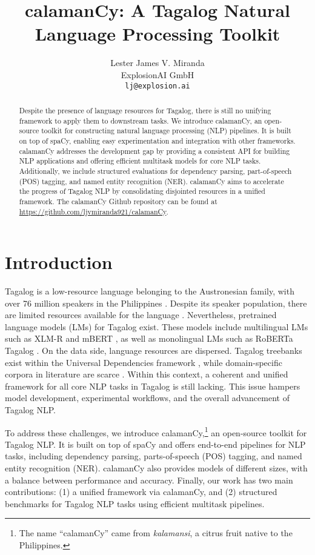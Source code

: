 \documentclass[11pt]{article}
\title{calamanCy: A Tagalog Natural Language Processing Toolkit}
\author{Lester James V. Miranda \\
  ExplosionAI GmbH \\
  \texttt{lj@explosion.ai}}
\begin{document}
\maketitle
\begin{abstract}
  Despite the presence of language resources for Tagalog, there is still no unifying framework to apply them to downstream tasks.
  We introduce calamanCy, an open-source toolkit for constructing natural language processing (NLP) pipelines.
  It is built on top of spaCy, enabling easy experimentation and integration with other frameworks.  
  calamanCy addresses the development gap by providing a consistent API for building NLP applications and offering efficient multitask models for core NLP tasks.
  Additionally, we include structured evaluations for dependency parsing, part-of-speech (POS) tagging, and named entity recognition (NER).
  calamanCy aims to accelerate the progress of Tagalog NLP by consolidating disjointed resources in a unified framework.
  The calamanCy Github repository can be found at \url{https://github.com/ljvmiranda921/calamanCy}.
\end{abstract}

\section{Introduction}

Tagalog is a low-resource language belonging to the Austronesian family, with over 76 million speakers in the Philippines \citep{Lewis2009EthnologueL}.
Despite its speaker population, there are limited resources available for the language \citep{Cruz2021ImprovingLL}. 
Nevertheless, pretrained language models (LMs) for Tagalog exist. 
These models include multilingual LMs such as XLM-R and mBERT \citep{Conneau2019UnsupervisedCR,Devlin2019BERTPO}, 
as well as monolingual LMs such as RoBERTa Tagalog \citep{Cruz2021ImprovingLL}. 
On the data side, language resources are dispersed.
Tagalog treebanks exist within the Universal Dependencies framework \citep{Dehouck2019PhylogenicMD,Kondratyuk201975L1,Aquino2020ParsingIT}, 
while domain-specific corpora in literature are scarce \citep{Enriquez2023DeterminingLF,Livelo2018IntelligentDI}. 
Within this context, a coherent and unified framework for all core NLP tasks in Tagalog is still lacking.
This issue hampers model development, experimental workflows, and the overall advancement of Tagalog NLP.

To address these challenges, we introduce calamanCy,\footnote[1]{
  The name ``calamanCy'' came from \textit{kalamansi}, a citrus fruit native to the Philippines.}
an open-source toolkit for Tagalog NLP. 
It is built on top of spaCy \citep{Honnibal2020Spacy} and offers end-to-end pipelines for NLP tasks, including dependency parsing, parts-of-speech (POS) tagging, and named entity recognition (NER). 
calamanCy also provides models of different sizes, with a balance between performance and accuracy.
Finally, our work has two main contributions: (1) a unified framework via calamanCy, and (2) structured benchmarks for Tagalog NLP tasks using efficient multitask pipelines.
\end{document}
